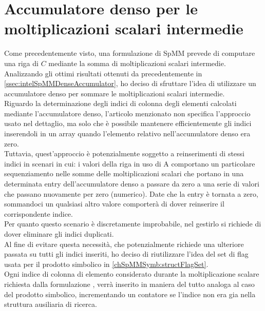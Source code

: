 \section{Accumulatore denso per le moltiplicazioni scalari intermedie} \label{chSpMMNum:scSparseVectMulPart}
Come precedentemente visto, una formulazione \rowbyrow di SpMM prevede di computare una riga di $C$ 
mediante la somma di moltiplicazioni scalari intermedie.\\
Analizzando gli ottimi risultati ottenuti da \cite{intelSpMMDenseAccumulator} precedentemente in 
\ref{ssec:intelSpMMDenseAccumulator}, ho deciso di sfruttare l'idea di utilizzare un accumulatore denso per 
sommare le moltiplicazioni scalari intermedie.\\
Riguardo la determinazione degli indici di colonna degli elementi \nnz calcolati mediante l'accumulatore denso,
l'articolo menzionato \cite{intelSpMMDenseAccumulator} non specifica l'approccio usato nel dettaglio, 
ma solo che è possibile mantenere efficientemente gli indici inserendoli in un array quando l'elemento relativo nell'accumulatore denso era zero.\\
Tuttavia, quest'approccio è potenzialmente soggetto a reinserimenti di stessi indici in scenari in cui:
i valori \nnz della riga in uso di A comportano un particolare sequenziamento nelle somme delle moltiplicazioni scalari che portano
in una determinata entry dell'accumulatore denso a passare da zero a una serie di valori che 
passano nuovamente per zero (numerico). Date che la entry è tornata a zero, sommandoci un qualsiasi altro valore \nnz 
comporterà di dover reinserire il corrispondente indice.\\
Per quanto questo scenario è discretamente improbabile, %
nel gestirlo si richiede di dover eliminare gli indici duplicati.\\
Al fine di evitare questa necessità, che potenzialmente richiede una ulteriore passata su tutti gli indici inseriti,
ho deciso di riutilizzare l'idea del set di flag usata per il prodotto simbolico in \ref{chSpMMSymb:structFlagSet}.\\
Ogni indice di colonna di elemento \nnz considerato durante la moltiplicazione scalare richiesta dalla formulazione \rowbyrow, 
verrà inserito in maniera del tutto analoga al caso del prodotto simbolico, incrementando un contatore se l'indice 
non era gia nella struttura ausiliaria di ricerca.\\
